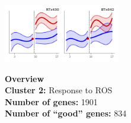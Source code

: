 \begin{multicols}{2}
\includegraphics[width=2in]{figures/clusters/leaf_Postflowering_1.png}
\columnbreak

\noindent \textbf{Overview}\\\textbf{Cluster 2:} Response to ROS \\
\textbf{Number of genes:} 1901 \\
\textbf{Number of ``good'' genes:} 834 \\
\end{multicols}

